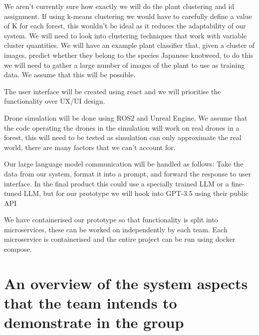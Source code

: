 \documentclass{article}
\begin{document}
We aren't currently sure how exactly we will do the plant clustering and id assignment.
If using k-means clustering we would have to carefully define a value of K for each forest, this wouldn't be ideal as it reduces the adaptability of our system.
We will need to look into clustering techniques that work with variable cluster quantities.
We will have an example plant classifier that, given a cluster of images, predict whether they belong to the species Japanese knotweed, to do this we will need to gather a large number of images of the plant to use as training data. 
We assume that this will be possible. %

The user interface will be created using react and we will prioritise the functionality over UX/UI design. 

Drone simulation will be done using ROS2 and Unreal Engine. %
We assume that the code operating the drones in the simulation will work on real drones in a forest, this will need to be tested as simulation can only approximate the real world, there are many factors that we can't account for.

Our large language model communication will be handled as follows: Take the data from our system, format it into a prompt, and forward the response to user interface.
In the final product this could use a specially trained LLM or a fine-tuned LLM, but for our prototype we will hook into GPT-3.5 using their public API %

We have containerised our prototype so that functionality is split into microservices, these can be worked on independently by each team.
Each microservice is containerised and the entire project can be run using docker compose.


\section{An overview of the system aspects that the team intends to demonstrate in the group}
\end{document}
